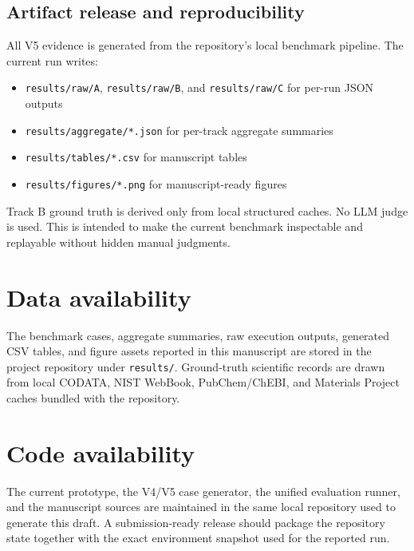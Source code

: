 \documentclass[12pt]{article}
\begin{document}
\subsection{Artifact release and reproducibility}

All V5 evidence is generated from the repository's local benchmark pipeline. The current run writes:
\begin{itemize}
\item \texttt{results/raw/A}, \texttt{results/raw/B}, and \texttt{results/raw/C} for per-run JSON outputs
\item \texttt{results/aggregate/*.json} for per-track aggregate summaries
\item \texttt{results/tables/*.csv} for manuscript tables
\item \texttt{results/figures/*.png} for manuscript-ready figures
\end{itemize}
Track B ground truth is derived only from local structured caches. No LLM judge is used. This is intended to make the current benchmark inspectable and replayable without hidden manual judgments.

\section*{Data availability}

The benchmark cases, aggregate summaries, raw execution outputs, generated CSV tables, and figure assets reported in this manuscript are stored in the project repository under \texttt{results/}. Ground-truth scientific records are drawn from local CODATA, NIST WebBook, PubChem/ChEBI, and Materials Project caches bundled with the repository.

\section*{Code availability}

The current prototype, the V4/V5 case generator, the unified evaluation runner, and the manuscript sources are maintained in the same local repository used to generate this draft. A submission-ready release should package the repository state together with the exact environment snapshot used for the reported run.
\end{document}

